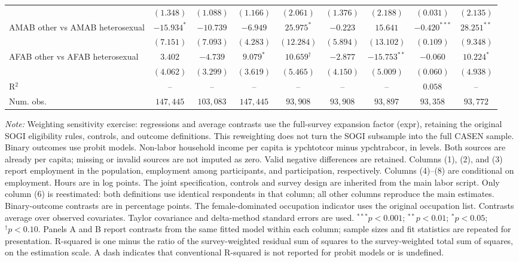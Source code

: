 \begin{table}[htpb!]
{\begin{tabular}{l c c c c c c c c}
 & $(1.348)$ & $(1.088)$ & $(1.166)$ & $(2.061)$ & $(1.376)$ & $(2.188)$ & $(0.031)$ & $(2.135)$ \\
AMAB other vs AMAB heterosexual & $-15.934^{*}$ & $-10.739$ & $-6.949$ & $25.975^{*}$ & $-0.223$ & $15.641$ & $-0.420^{***}$ & $28.251^{**}$ \\
 & $(7.151)$ & $(7.093)$ & $(4.283)$ & $(12.284)$ & $(5.894)$ & $(13.102)$ & $(0.109)$ & $(9.348)$ \\
AFAB other vs AFAB heterosexual & $3.402$ & $-4.739$ & $9.079^{*}$ & $10.659^{\dagger}$ & $-2.877$ & $-15.753^{**}$ & $-0.060$ & $10.224^{*}$ \\
 & $(4.062)$ & $(3.299)$ & $(3.619)$ & $(5.465)$ & $(4.150)$ & $(5.009)$ & $(0.060)$ & $(4.938)$ \\
\hline
R$^2$ & -- & -- & -- & -- & -- & -- & $0.058$ & -- \\
Num. obs. & $147,445$ & $103,083$ & $147,445$ & $93,908$ & $93,908$ & $93,897$ & $93,358$ & $93,772$ \\
\hline
\end{tabular}%
}
\par\vspace{1ex}
\begin{minipage}{\textwidth}\footnotesize\raggedright
\textit{Note:} Weighting sensitivity exercise: regressions and average contrasts use the full-survey expansion factor (expr), retaining the original SOGI eligibility rules, controls, and outcome definitions. This reweighting does not turn the SOGI subsample into the full CASEN sample. Binary outcomes use probit models. Non-labor household income per capita is ypchtotcor minus ypchtrabcor, in levels. Both sources are already per capita; missing or invalid sources are not imputed as zero. Valid negative differences are retained. Columns (1), (2), and (3) report employment in the population, employment among participants, and participation, respectively. Columns (4)--(8) are conditional on employment. Hours are in log points. The joint specification, controls and survey design are inherited from the main labor script. Only column (6) is reestimated: both definitions use identical respondents in that column; all other columns reproduce the main estimates. Binary-outcome contrasts are in percentage points. The female-dominated occupation indicator uses the original occupation list. Contrasts average over observed covariates. Taylor covariance and delta-method standard errors are used. $^{***}p<0.001$; $^{**}p<0.01$; $^{*}p<0.05$; $^{\dagger}p<0.10$. Panels A and B report contrasts from the same fitted model within each column; sample sizes and fit statistics are repeated for presentation. R-squared is one minus the ratio of the survey-weighted residual sum of squares to the survey-weighted total sum of squares, on the estimation scale. A dash indicates that conventional R-squared is not reported for probit models or is undefined.
\end{minipage}
\end{table}
